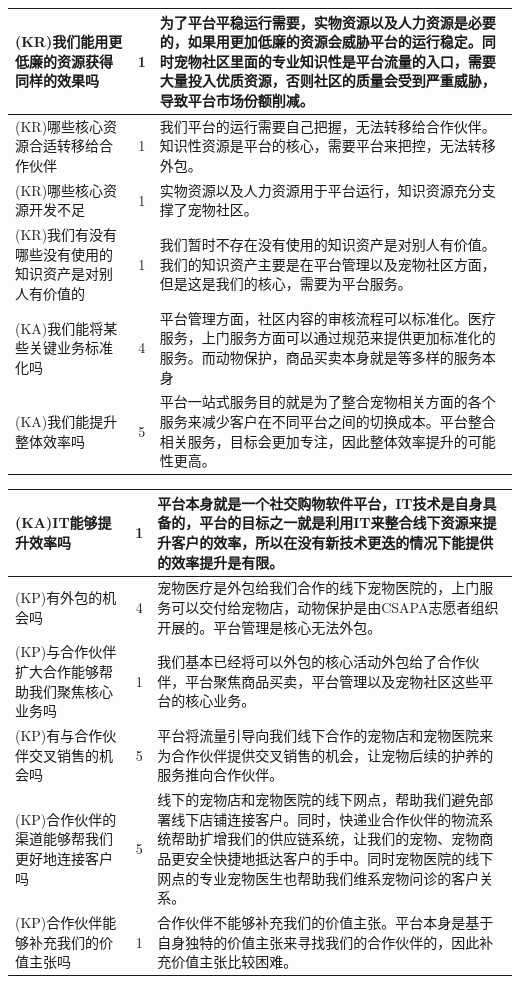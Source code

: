 \documentclass[a4paper]{ctexart}
\begin{document}
\begin{table}[h]
  \centering
\begin{tabular}{|p{3.5cm}|c|p{10cm}|}
  \hline
  (KR)我们能用更低廉的资源获得同样的效果吗 & 1 & 为了平台平稳运行需要，实物资源以及人力资源是必要的，如果用更加低廉的资源会威胁平台的运行稳定。同时宠物社区里面的专业知识性是平台流量的入口，需要大量投入优质资源，否则社区的质量会受到严重威胁，导致平台市场份额削减。\\
  \hline
  (KR)哪些核心资源合适转移给合作伙伴 & 1 & 我们平台的运行需要自己把握，无法转移给合作伙伴。知识性资源是平台的核心，需要平台来把控，无法转移外包。\\
  \hline
  (KR)哪些核心资源开发不足 & 1 & 实物资源以及人力资源用于平台运行，知识资源充分支撑了宠物社区。\\
  \hline
  (KR)我们有没有哪些没有使用的知识资产是对别人有价值的 & 1 & 我们暂时不存在没有使用的知识资产是对别人有价值。我们的知识资产主要是在平台管理以及宠物社区方面，但是这是我们的核心，需要为平台服务。\\
  \hline
  (KA)我们能将某些关键业务标准化吗 & 4 & 平台管理方面，社区内容的审核流程可以标准化。医疗服务，上门服务方面可以通过规范来提供更加标准化的服务。而动物保护，商品买卖本身就是等多样的服务本身\\
  \hline
  (KA)我们能提升整体效率吗 & 5 & 平台一站式服务目的就是为了整合宠物相关方面的各个服务来减少客户在不同平台之间的切换成本。平台整合相关服务，目标会更加专注，因此整体效率提升的可能性更高。\\
  \hline
\end{tabular}
\end{table}
\begin{table}[h]
  \centering
\begin{tabular}{|p{3.5cm}|c|p{10cm}|}
  \hline
  (KA)IT能够提升效率吗 & 1 & 平台本身就是一个社交购物软件平台，IT技术是自身具备的，平台的目标之一就是利用IT来整合线下资源来提升客户的效率，所以在没有新技术更迭的情况下能提供的效率提升是有限。\\
  \hline
  (KP)有外包的机会吗 & 4 & 宠物医疗是外包给我们合作的线下宠物医院的，上门服务可以交付给宠物店，动物保护是由CSAPA志愿者组织开展的。平台管理是核心无法外包。\\
  \hline
  (KP)与合作伙伴扩大合作能够帮助我们聚焦核心业务吗 & 1 & 我们基本已经将可以外包的核心活动外包给了合作伙伴，平台聚焦商品买卖，平台管理以及宠物社区这些平台的核心业务。\\
  \hline
  (KP)有与合作伙伴交叉销售的机会吗 & 5 & 平台将流量引导向我们线下合作的宠物店和宠物医院来为合作伙伴提供交叉销售的机会，让宠物后续的护养的服务推向合作伙伴。\\
  \hline
  (KP)合作伙伴的渠道能够帮我们更好地连接客户吗 & 5 & 线下的宠物店和宠物医院的线下网点，帮助我们避免部署线下店铺连接客户。同时，快递业合作伙伴的物流系统帮助扩增我们的供应链系统，让我们的宠物、宠物商品更安全快捷地抵达客户的手中。同时宠物医院的线下网点的专业宠物医生也帮助我们维系宠物问诊的客户关系。\\
  \hline
  (KP)合作伙伴能够补充我们的价值主张吗 & 1 & 合作伙伴不能够补充我们的价值主张。平台本身是基于自身独特的价值主张来寻找我们的合作伙伴的，因此补充价值主张比较困难。\\
  \hline
\end{tabular}
\end{table}
\end{document}
